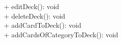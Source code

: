 { 
    + editDeck(): void \\ 
    + deleteDeck(): void\\
    + addCardToDeck(): void \\
    + addCardsOfCategoryToDeck(): void \\
}{}